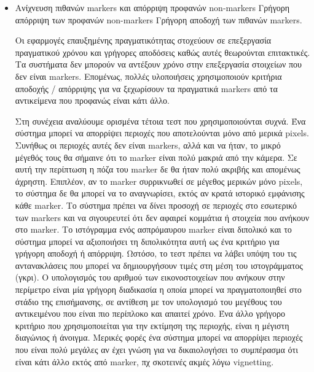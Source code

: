 \begin{itemize}
\item Ανίχνευση πιθανών markers και απόρριψη προφανών non-markers 
Γρήγορη απόρριψη των προφανών non-markers
Γρήγορη αποδοχή των πιθανών markers.

Οι εφαρμογές επαυξημένης πραγματικότητας στοχεύουν σε επεξεργασία πραγματικού χρόνου και γρήγορες αποδόσεις καθώς αυτές θεωρούνται επιτακτικές. Τα συστήματα δεν μπορούν να αντέξουν χρόνο στην επεξεργασία στοιχείων που δεν είναι markers. 
Επομένως, πολλές υλοποιήσεις χρησιμοποιούν κριτήρια αποδοχής / απόρριψης για να ξεχωρίσουν τα πραγματικά markers από τα αντικείμενα που προφανώς είναι κάτι άλλο.

Στη συνέχεια αναλύουμε ορισμένα τέτοια τεστ που χρησιμοποιούνται συχνά.
Ένα σύστημα μπορεί να απορρίψει περιοχές που αποτελούνται μόνο από μερικά pixels. Συνήθως οι περιοχές αυτές δεν είναι markers, αλλά και να ήταν, το μικρό μέγεθός τους θα σήμαινε ότι το marker είναι πολύ μακριά από την κάμερα. Σε αυτή την περίπτωση η πόζα του marker δε θα ήταν πολύ ακριβής και απομένως άχρηστη. Επιπλέον, αν το marker συρρικνωθεί σε μέγεθος μερικών μόνο pixels, το σύστημα δε θα μπορεί να το αναγνωρίσει, εκτός αν κρατά ιστορικό εμφάνισης κάθε marker.
Το σύστημα πρέπει να δίνει προσοχή σε περιοχές στο εσωτερικό των markers και να σιγουρευτεί ότι δεν αφαιρεί κομμάτια ή στοιχεία που ανήκουν στο marker. Το ιστόγραμμα ενός ασπρόμαυρου marker είναι διπολικό και το σύστημα μπορεί να αξιοποιήσει τη διπολικότητα αυτή ως ένα κριτήριο για γρήγορη αποδοχή ή απόρριψη. Ωστόσο, το τεστ πρέπει να λάβει υπόψη του τις αντανακλάσεις που μπορεί να δημιουργήσουν τιμές στη μέση του ιστογράμματος (γκρι). Ο υπολογισμός του αριθμού των εικονοστοιχείων που ανήκουν στην περίμετρο είναι μία γρήγορη διαδικασία η οποία μπορεί να πραγματοποιηθεί στο στάδιο της επισήμανσης, σε αντίθεση με τον υπολογισμό του μεγέθους του αντικειμένου που είναι πιο περίπλοκο και απαιτεί χρόνο. Ένα άλλο γρήγορο κριτήριο που χρησιμοποιείται για την εκτίμηση της περιοχής, είναι η μέγιστη διαγώνιος ή άνοιγμα. Μερικές φορές ένα σύστημα μπορεί να απορρίψει περιοχές που είναι πολύ μεγάλες αν έχει γνώση για να δικαιολογήσει το συμπέρασμα ότι είναι κάτι άλλο εκτός από marker, πχ σκοτεινές ακμές λόγω vignetting.


\end{itemize}
